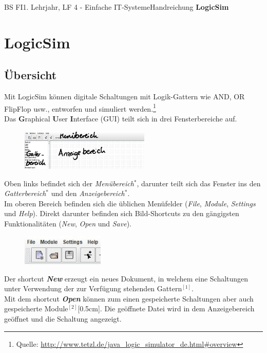\documentclass[11pt,oneside,openany,headings=optiontotoc,11pt,numbers=noenddot]{article}
\begin{document}
	\begin{worksheet}{BS FI}{1. Lehrjahr, LF 4 - Einfache IT-Systeme}{Handreichung \textbf{LogicSim}}
		\section{LogicSim}
		\subsection*{Übersicht}
		
		\glqq{}Mit LogicSim können digitale Schaltungen mit Logik-Gattern wie AND, OR FlipFlop usw., entworfen und simuliert werden.\grqq{}\footnote{Quelle: \url{http://www.tetzl.de/java\_logic\_simulator\_de.html\#overview}}\\
		Das \textbf{G}raphical \textbf{U}ser \textbf{I}nterface (GUI) teilt sich in drei Fensterbereiche auf.
		\begin{figure}
			\includegraphics[width=0.55\textwidth]{../99_Bilder/LS.jpg}
		\end{figure}
		Oben links befindet sich der \textit{Menübereich}\(^*\), darunter teilt sich das Fenster ins den \textit{Gatterbereich}\(^*\) und den \textit{Anzeigebereich}\(^*\).\\
		Im oberen Bereich befinden sich die üblichen Menüfelder (\textit{File}, \textit{Module}, \textit{Settings} und \textit{Help}). Direkt darunter befinden sich Bild-Shortcuts zu den gängigsten Funktionalitäten (\textit{New}, \textit{Open} und \textit{Save}).\\
		\par\noindent
		\begin{figure}
			\vspace{-10pt}
			\includegraphics[width=0.35\textwidth]{../99_Bilder/menu_LS.jpg}
		\end{figure}
		Der shortcut \textit{\textbf{New}} erzeugt ein neues Dokument, in welchem eine Schaltungen unter Verwendung der zur Verfügung stehenden Gattern\(^{[1]}\).\\
		Mit dem shortcut \textit{\textbf{Open}} können zum einen gespeicherte Schaltungen aber auch gespeicherte Module\(^{[2]}\)[0.5cm]. Die geöffnete Datei wird in dem Anzeigebereich geöffnet und die Schaltung angezeigt.

\end{worksheet}
\end{document}
